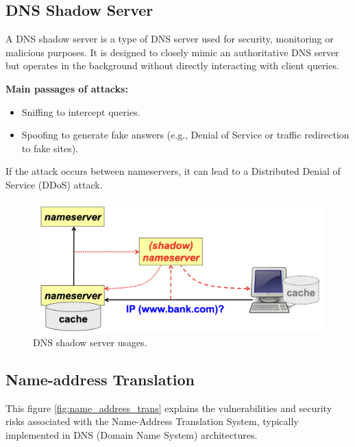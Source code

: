 \subsection{DNS Shadow Server}
A DNS shadow server is a type of DNS server used for security, monitoring or malicious purposes. It is designed to closely mimic an authoritative DNS server but operates in the background without directly interacting with client queries.

\hfill


\textbf{Main passages of attacks:}
\begin{itemize}
    \item Sniffing to intercept queries.
    \item Spoofing to generate fake answers (e.g., Denial of Service or traffic redirection to fake sites).
\end{itemize}

If the attack occurs between nameservers, it can lead to a Distributed Denial of Service (DDoS) attack.
\begin{figure}[H]
  \includegraphics[width=\linewidth]{Images/NetSec/dns_shadow_server.png}
  \caption{DNS shadow server usages.}
\end{figure}

\subsection{Name-address Translation}
This figure \ref{fig:name_address_trans} explains the vulnerabilities and security risks associated with the Name-Address Translation System, typically implemented in DNS (Domain Name System) architectures.

